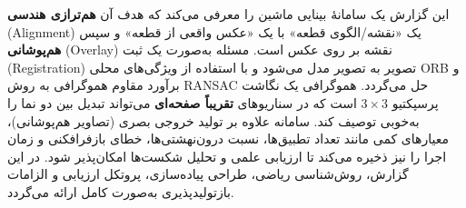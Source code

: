 
این گزارش یک سامانهٔ بینایی ماشین را معرفی می‌کند که هدف آن \textbf{هم‌ترازی هندسی} (Alignment) یک «نقشه/الگوی قطعه» با یک «عکس واقعی از قطعه» و سپس \textbf{هم‌پوشانی} (Overlay) نقشه بر روی عکس است. مسئله به‌صورت یک ثبت (Registration) تصویر به تصویر مدل می‌شود و با استفاده از ویژگی‌های محلی ORB و برآورد مقاوم هموگرافی به روش RANSAC حل می‌گردد. هموگرافی یک نگاشت پرسپکتیو $3\times3$ است که در سناریوهای \textbf{تقریباً صفحه‌ای} می‌تواند تبدیل بین دو نما را به‌خوبی توصیف کند. سامانه علاوه بر تولید خروجی بصری (تصاویر هم‌پوشانی)، معیارهای کمی مانند تعداد تطبیق‌ها، نسبت درون‌نهشتی‌ها، خطای بازفرافکنی و زمان اجرا را نیز ذخیره می‌کند تا ارزیابی علمی و تحلیل شکست‌ها امکان‌پذیر شود. در این گزارش، روش‌شناسی ریاضی، طراحی پیاده‌سازی، پروتکل ارزیابی و الزامات بازتولیدپذیری به‌صورت کامل ارائه می‌گردد.
